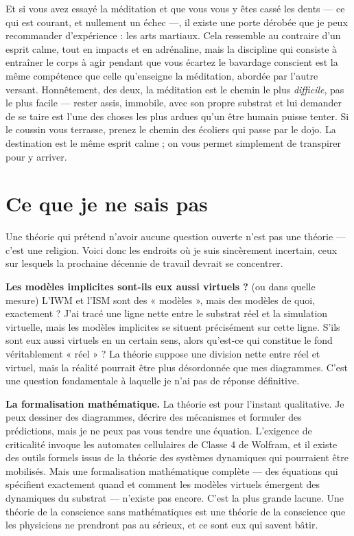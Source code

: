\documentclass[11pt, twoside, openright]{book}
\begin{document}
Et si vous avez essayé la méditation et que vous vous y êtes cassé les dents --- ce qui est courant, et nullement un échec ---, il existe une porte dérobée que je peux recommander d'expérience : les arts martiaux. Cela ressemble au contraire d'un esprit calme, tout en impacts et en adrénaline, mais la discipline qui consiste à entraîner le corps à agir pendant que vous écartez le bavardage conscient est la même compétence que celle qu'enseigne la méditation, abordée par l'autre versant. Honnêtement, des deux, la méditation est le chemin le plus \textit{difficile}, pas le plus facile --- rester assis, immobile, avec son propre substrat et lui demander de se taire est l'une des choses les plus ardues qu'un être humain puisse tenter. Si le coussin vous terrasse, prenez le chemin des écoliers qui passe par le dojo. La destination est le même esprit calme ; on vous permet simplement de transpirer pour y arriver.

\section*{Ce que je ne sais pas}

Une théorie qui prétend n'avoir aucune question ouverte n'est pas une théorie --- c'est une religion. Voici donc les endroits où je suis sincèrement incertain, ceux sur lesquels la prochaine décennie de travail devrait se concentrer.

\textbf{Les modèles implicites sont-ils eux aussi virtuels ?} (ou dans quelle mesure) L'IWM et l'ISM sont des « modèles », mais des modèles de quoi, exactement ? J'ai tracé une ligne nette entre le substrat réel et la simulation virtuelle, mais les modèles implicites se situent précisément sur cette ligne. S'ils sont eux aussi virtuels en un certain sens, alors qu'est-ce qui constitue le fond véritablement « réel » ? La théorie suppose une division nette entre réel et virtuel, mais la réalité pourrait être plus désordonnée que mes diagrammes. C'est une question fondamentale à laquelle je n'ai pas de réponse définitive.

\textbf{La formalisation mathématique.} La théorie est pour l'instant qualitative. Je peux dessiner des diagrammes, décrire des mécanismes et formuler des prédictions, mais je ne peux pas vous tendre une équation. L'exigence de criticalité invoque les automates cellulaires de Classe 4 de Wolfram, et il existe des outils formels issus de la théorie des systèmes dynamiques qui pourraient être mobilisés. Mais une formalisation mathématique complète --- des équations qui spécifient exactement quand et comment les modèles virtuels émergent des dynamiques du substrat --- n'existe pas encore. C'est la plus grande lacune. Une théorie de la conscience sans mathématiques est une théorie de la conscience que les physiciens ne prendront pas au sérieux, et ce sont eux qui savent bâtir.
\end{document}
